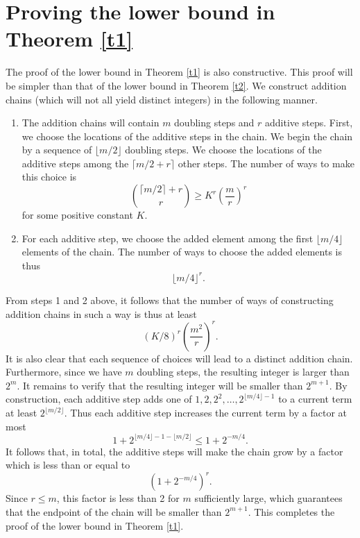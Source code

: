 \documentclass{article}
\theoremstyle{definition}
\begin{document}
\section{Proving the lower bound in  Theorem \ref{t1}}

The proof of the lower bound in Theorem \ref{t1} is also  constructive. This proof will be simpler than that of the lower bound in Theorem \ref{t2}. We construct addition chains (which will not all yield distinct integers) in the following manner.
\begin{enumerate}
\item The addition chains will contain $m$ doubling steps and $r$ additive steps.  First, we choose the locations of the additive steps in the chain. We begin the chain by a sequence of $\lfloor m/2\rfloor$ doubling steps. We choose the locations of the additive steps among the $\lceil m/2+r\rceil$ other steps. The number of ways to make this choice is
$$
{\lceil m/2\rceil+r \choose r}\ge K^r\left(\frac{m}{r}\right)^r
$$
for some positive constant $K$.
\item For each additive step, we choose the added element among the first $\lfloor m/4\rfloor$ elements of the chain.  The number of ways to choose the added elements is thus
$$
\lfloor m/4\rfloor ^r.
$$
\end{enumerate}

From steps 1 and 2 above, it follows that the number of ways of constructing addition chains in such a way is thus at least
$$
(K/8)^r \left(\frac{m^2}{r}\right)^r.
$$
It is also clear that each sequence of choices will lead to a distinct addition chain. Furthermore, since we have $m$ doubling steps, the resulting integer is larger  than $2^m$.  It remains to verify that the resulting integer will be smaller than $2^{m+1}$. 
By construction, each additive step adds one of
$1,2,2^2,\ldots,2^{\lfloor m/4\rfloor-1}$
to a current term at least $2^{\lfloor m/2\rfloor}$.
Thus each additive step increases the current term by a factor
at most
$$
1+2^{\lfloor m/4\rfloor-1-\lfloor m/2\rfloor}
\le 1+2^{-m/4}.
$$
It follows that, in total, the additive steps will make the chain grow by a factor which is less than or equal to
$$
(1+2^{-m/4})^r.
$$
Since $r\le m$,  this factor is less than 2 for $m$ sufficiently large, which guarantees that the endpoint of the chain will be smaller than $2^{m+1}$. This completes the proof of the lower bound in Theorem \ref{t1}.
\end{document}
